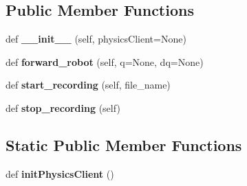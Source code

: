 \subsection*{Public Member Functions}
\begin{DoxyCompactItemize}
\item 
def {\bfseries \+\_\+\+\_\+init\+\_\+\+\_\+} (self, physics\+Client=None)\hypertarget{classrobot__properties__solo_1_1quadruped12wrapper_1_1Quadruped12Robot_a8171c7cf1414ee71560a0060d755ac3f}{}\label{classrobot__properties__solo_1_1quadruped12wrapper_1_1Quadruped12Robot_a8171c7cf1414ee71560a0060d755ac3f}

\item 
def {\bfseries forward\+\_\+robot} (self, q=None, dq=None)\hypertarget{classrobot__properties__solo_1_1quadruped12wrapper_1_1Quadruped12Robot_a9a8b5e460e54ec59a00b4341c52fee2f}{}\label{classrobot__properties__solo_1_1quadruped12wrapper_1_1Quadruped12Robot_a9a8b5e460e54ec59a00b4341c52fee2f}

\item 
def {\bfseries start\+\_\+recording} (self, file\+\_\+name)\hypertarget{classrobot__properties__solo_1_1quadruped12wrapper_1_1Quadruped12Robot_ab601f30d87aa9b711c3d7d7def0312db}{}\label{classrobot__properties__solo_1_1quadruped12wrapper_1_1Quadruped12Robot_ab601f30d87aa9b711c3d7d7def0312db}

\item 
def {\bfseries stop\+\_\+recording} (self)\hypertarget{classrobot__properties__solo_1_1quadruped12wrapper_1_1Quadruped12Robot_a1bb2fd5cc2c45c2812dc9874449274d1}{}\label{classrobot__properties__solo_1_1quadruped12wrapper_1_1Quadruped12Robot_a1bb2fd5cc2c45c2812dc9874449274d1}

\end{DoxyCompactItemize}
\subsection*{Static Public Member Functions}
\begin{DoxyCompactItemize}
\item 
def {\bfseries init\+Physics\+Client} ()\hypertarget{classrobot__properties__solo_1_1quadruped12wrapper_1_1Quadruped12Robot_a02e6228a8e81b0359a02f481ea4bd4a6}{}\label{classrobot__properties__solo_1_1quadruped12wrapper_1_1Quadruped12Robot_a02e6228a8e81b0359a02f481ea4bd4a6}

\end{DoxyCompactItemize}
